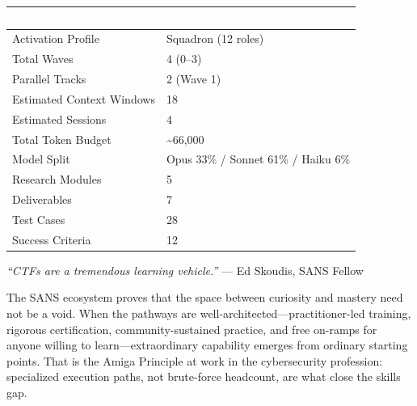 \documentclass[11pt,letterpaper]{article}
\newcommand{\tableheader}[1]{\textbf{\sffamily\textcolor{white}{#1}}}
\begin{document}
\begin{center}
\begin{tabularx}{\textwidth}{L{5cm}X}
\toprule
{}
\tableheader{Metric} & \tableheader{Value} \\
\midrule
Activation Profile & Squadron (12 roles) \\
Total Waves & 4 (0--3) \\
Parallel Tracks & 2 (Wave 1) \\
Estimated Context Windows & 18 \\
Estimated Sessions & 4 \\
Total Token Budget & \textasciitilde66,000 \\
Model Split & Opus 33\% / Sonnet 61\% / Haiku 6\% \\
Research Modules & 5 \\
Deliverables & 7 \\
Test Cases & 28 \\
Success Criteria & 12 \\
\bottomrule
\end{tabularx}
\end{center}

\vspace{1em}

\begin{quotebox}
\emph{``CTFs are a tremendous learning vehicle.''} --- Ed Skoudis, SANS Fellow

\vspace{0.5em}

The SANS ecosystem proves that the space between curiosity and mastery need not be a void. When the pathways are well-architected---practitioner-led training, rigorous certification, community-sustained practice, and free on-ramps for anyone willing to learn---extraordinary capability emerges from ordinary starting points. That is the Amiga Principle at work in the cybersecurity profession: specialized execution paths, not brute-force headcount, are what close the skills gap.
\end{quotebox}
\end{document}
